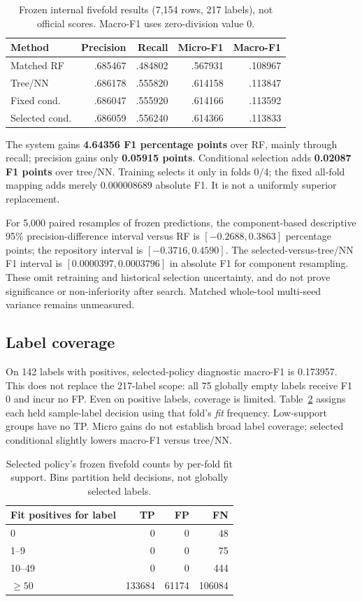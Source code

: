 \documentclass[10pt,conference]{IEEEtran}
\begin{document}
\begin{table}[t]
\caption{Frozen internal fivefold results (7,154 rows, 217 labels), not official scores. Macro-F1 uses zero-division value 0.}
\label{tab:fivefold}
\centering\small
\begin{tabular}{@{}lrrrr@{}}
\toprule
Method & Precision & Recall & Micro-F1 & Macro-F1\\
\midrule
Matched RF & .685467 & .484802 & .567931 & .108967\\
Tree/NN & .686178 & .555820 & .614158 & .113847\\
Fixed cond. & .686047 & .555920 & .614166 & .113592\\
Selected cond. & .686059 & .556240 & .614366 & .113833\\
\bottomrule
\end{tabular}
\end{table}

The system gains \textbf{4.64356 F1 percentage points} over RF, mainly through recall; precision gains only \textbf{0.05915 points}. Conditional selection adds \textbf{0.02087 F1 points} over tree/NN. Training selects it only in folds 0/4; the fixed all-fold mapping adds merely 0.000008689 absolute F1. It is not a uniformly superior replacement.

For 5,000 paired resamples of frozen predictions, the component-based descriptive 95\% precision-difference interval versus RF is $[-0.2688,0.3863]$ percentage points; the repository interval is $[-0.3716,0.4590]$. The selected-versus-tree/NN F1 interval is $[0.0000397,0.0003796]$ in absolute F1 for component resampling. These omit retraining and historical selection uncertainty, and do not prove significance or non-inferiority after search. Matched whole-tool multi-seed variance remains unmeasured.

\subsection{Label coverage}
On 142 labels with positives, selected-policy diagnostic macro-F1 is 0.173957. This does not replace the 217-label scope: all 75 globally empty labels receive F1 0 and incur no FP. Even on positive labels, coverage is limited. Table~\ref{tab:tail} assigns each held sample-label decision using that fold's \emph{fit} frequency. Low-support groups have no TP. Micro gains do not establish broad label coverage; selected conditional slightly lowers macro-F1 versus tree/NN.

\begin{table}[t]
\caption{Selected policy's frozen fivefold counts by per-fold fit support. Bins partition held decisions, not globally selected labels.}
\label{tab:tail}
\centering\small
\begin{tabular}{@{}lrrr@{}}
\toprule
Fit positives for label & TP & FP & FN\\
\midrule
0 & 0 & 0 & 48\\
1--9 & 0 & 0 & 75\\
10--49 & 0 & 0 & 444\\
$\geq50$ & 133684 & 61174 & 106084\\
\bottomrule
\end{tabular}
\end{table}
\end{document}
